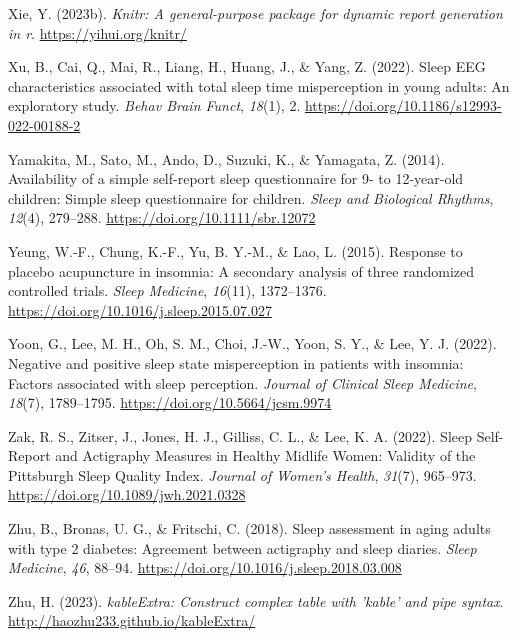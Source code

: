 \documentclass[
]{article}
\newlength{\cslhangindent}
\newenvironment{CSLReferences}[2] %
 {\begin{list}{}{%
  \setlength{\itemindent}{0pt}
  \setlength{\leftmargin}{0pt}
  \setlength{\parsep}{0pt}
  \ifodd #1
   \setlength{\leftmargin}{\cslhangindent}
   \setlength{\itemindent}{-1\cslhangindent}
  \fi
  \setlength{\itemsep}{#2\baselineskip}}}
 {\end{list}}
\begin{document}
\begin{CSLReferences}{1}{0}
Xie, Y. (2023b). \emph{Knitr: A general-purpose package for dynamic report generation in r}. \url{https://yihui.org/knitr/}

Xu, B., Cai, Q., Mai, R., Liang, H., Huang, J., \& Yang, Z. (2022). Sleep {EEG} characteristics associated with total sleep time misperception in young adults: An exploratory study. \emph{Behav Brain Funct}, \emph{18}(1), 2. \url{https://doi.org/10.1186/s12993-022-00188-2}

Yamakita, M., Sato, M., Ando, D., Suzuki, K., \& Yamagata, Z. (2014). Availability of a simple self-report sleep questionnaire for 9- to 12-year-old children: {Simple} sleep questionnaire for children. \emph{Sleep and Biological Rhythms}, \emph{12}(4), 279--288. \url{https://doi.org/10.1111/sbr.12072}

Yeung, W.-F., Chung, K.-F., Yu, B. Y.-M., \& Lao, L. (2015). Response to placebo acupuncture in insomnia: A secondary analysis of three randomized controlled trials. \emph{Sleep Medicine}, \emph{16}(11), 1372--1376. \url{https://doi.org/10.1016/j.sleep.2015.07.027}

Yoon, G., Lee, M. H., Oh, S. M., Choi, J.-W., Yoon, S. Y., \& Lee, Y. J. (2022). Negative and positive sleep state misperception in patients with insomnia: Factors associated with sleep perception. \emph{Journal of Clinical Sleep Medicine}, \emph{18}(7), 1789--1795. \url{https://doi.org/10.5664/jcsm.9974}

Zak, R. S., Zitser, J., Jones, H. J., Gilliss, C. L., \& Lee, K. A. (2022). Sleep {Self}-{Report} and {Actigraphy} {Measures} in {Healthy} {Midlife} {Women}: {Validity} of the {Pittsburgh} {Sleep} {Quality} {Index}. \emph{Journal of Women's Health}, \emph{31}(7), 965--973. \url{https://doi.org/10.1089/jwh.2021.0328}

Zhu, B., Bronas, U. G., \& Fritschi, C. (2018). Sleep assessment in aging adults with type 2 diabetes: Agreement between actigraphy and sleep diaries. \emph{Sleep Medicine}, \emph{46}, 88--94. \url{https://doi.org/10.1016/j.sleep.2018.03.008}

Zhu, H. (2023). \emph{kableExtra: Construct complex table with 'kable' and pipe syntax}. \url{http://haozhu233.github.io/kableExtra/}


\end{CSLReferences}
\end{document}
